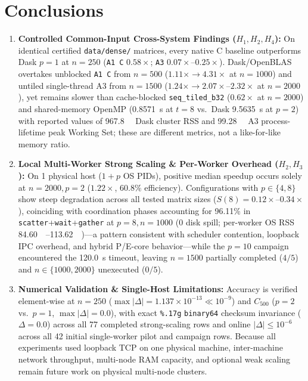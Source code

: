 \documentclass[11pt,a4paper]{article}
\begin{document}
\section{Conclusions}
\begin{enumerate}
    \item \textbf{Controlled Common-Input Cross-System Findings ($H_1, H_2, H_4$):} On identical certified \nolinkurl{data/dense/} matrices, every native C baseline outperforms Dask $p=1$ at $n=250$ (\texttt{A1 C} $0.58\times$; \texttt{A3} $0.07{\times}\text{--}0.25{\times}$). Dask/OpenBLAS overtakes unblocked \texttt{A1 C} from $n=500$ ($1.11\times \to 4.31\times$ at $n=1000$) and untiled single-thread A3 from $n=1500$ ($1.24\times \to 2.07{\times}\text{--}2.32{\times}$ at $n=2000$), yet remains slower than cache-blocked \texttt{seq\_tiled\_b32} ($0.62\times$ at $n=2000$) and shared-memory OpenMP (\SI{0.8571}{\second} at $t=8$ vs.\ Dask \SI{9.5635}{\second} at $p=2$) with reported values of \SI{967.8}{\mebi\byte} Dask cluster RSS and \SI{99.28}{\mebi\byte} A3 process-lifetime peak Working Set; these are different metrics, not a like-for-like memory ratio.
    \item \textbf{Local Multi-Worker Strong Scaling \& Per-Worker Overhead ($H_2, H_3$):} On 1 physical host ($1+p$ OS PIDs), positive median speedup occurs solely at $n=2000, p=2$ ($1.22\times$, $60.8\%$ efficiency). Configurations with $p \in \{4, 8\}$ show steep degradation across all tested matrix sizes ($S(8)=0.12{\times}\text{--}0.34{\times}$), coinciding with coordination phases accounting for 96.11\% in \texttt{scatter}+\texttt{wait}+\texttt{gather} at $p=8, n=1000$ (\SI{0}{\byte} disk spill; per-worker OS RSS \SIrange{84.60}{113.62}{\mebi\byte})---a pattern consistent with scheduler contention, loopback IPC overhead, and hybrid P/E-core behavior---while the $p=10$ campaign encountered the \SI{120.0}{\second} timeout, leaving $n=1500$ partially completed ($4/5$) and $n \in \{1000, 2000\}$ unexecuted ($0/5$).
    \item \textbf{Numerical Validation \& Single-Host Limitations:} Accuracy is verified element-wise at $n=250$ ($\max|\Delta|=1.137\times 10^{-13} \ll 10^{-9}$) and $C_{500}$ ($p=2$ vs.\ $p=1$, $\max|\Delta|=0.0$), with exact \texttt{\%.17g} \texttt{binary64} checksum invariance ($\Delta=0.0$) across all 77 completed strong-scaling rows and online $|\Delta| \le 10^{-6}$ across all 42 initial single-worker pilot and campaign rows. Because all experiments used loopback TCP on one physical machine, inter-machine network throughput, multi-node RAM capacity, and optional weak scaling remain future work on physical multi-node clusters.
\end{enumerate}
\end{document}
